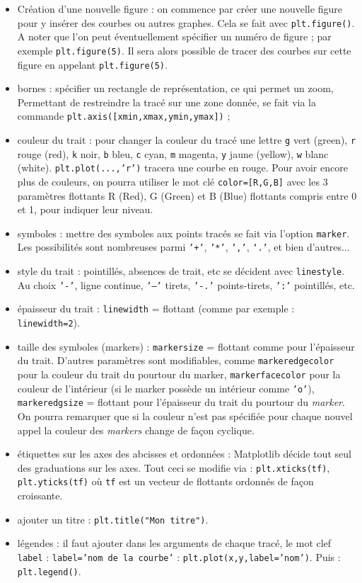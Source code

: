 \documentclass[a4paper,11pt,titlepage]{report}
\begin{document}
\begin{itemize}
\item Création d'une nouvelle figure : on commence par créer une nouvelle figure pour y insérer des courbes ou autres graphes. Cela se fait avec \texttt{plt.figure()}. A noter que l'on peut éventuellement spécifier un numéro de figure ; par exemple \texttt{plt.figure(5)}. Il sera alors possible de tracer des courbes sur cette figure en appelant \texttt{plt.figure(5)}.
\item bornes : spécifier un rectangle de représentation, ce qui permet un zoom, Permettant de restreindre la tracé sur une zone donnée, se fait via la commande \texttt{plt.axis([xmin,xmax,ymin,ymax])} ;
\item couleur du trait : pour changer la couleur du tracé une lettre \texttt{g} vert (green), \texttt{r} rouge (red), \texttt{k} noir, \texttt{b} bleu, \texttt{c} cyan, \texttt{m} magenta, \texttt{y} jaune (yellow), \texttt{w} blanc (white). \texttt{plt.plot(...,'r')} tracera une courbe en rouge. Pour avoir encore plus de couleurs, on pourra utiliser le mot clé \texttt{color=[R,G,B]} avec les 3 paramètres flottants R (Red), G (Green) et B (Blue) flottants compris entre 0 et 1, pour indiquer leur niveau.
\item symboles : mettre des symboles aux points tracés se fait via l’option \texttt{marker}. Les possibilités sont nombreuses parmi \texttt{'+'}, \texttt{'*'}, \texttt{','}, \texttt{‘.’}, et bien d'autres...
\item style du trait : pointillés, absences de trait, etc se décident avec \texttt{linestyle}. Au choix \texttt{'-'}, ligne continue, \texttt{'--'} tirets, \texttt{'-.'} points-tirets, \texttt{':'} pointillés, etc.
\item épaisseur du trait : \texttt{linewidth} = flottant (comme par exemple : \texttt{linewidth=2}).
\item taille des symboles (markers) : \texttt{markersize} = flottant comme pour l’épaisseur du trait. D’autres paramètres sont modifiables, comme \texttt{markeredgecolor} pour la couleur du trait du pourtour du marker, \texttt{markerfacecolor} pour la couleur de l’intérieur (si le marker possède un intérieur comme \texttt{'o'}), \texttt{markeredgsize} = flottant pour l’épaisseur du trait du pourtour du \textit{marker}. On pourra remarquer que si la couleur n’est pas spécifiée pour chaque nouvel appel la couleur des \textit{markers} change de façon cyclique.
\item étiquettes sur les axes des abcisses et ordonnées : Matplotlib décide tout seul des graduations sur les axes. Tout ceci se modifie via : \texttt{plt.xticks(tf)}, \texttt{plt.yticks(tf)} où \texttt{tf} est un vecteur de flottants ordonnés de façon croissante.
\item ajouter un titre : \texttt{plt.title("Mon titre")}.
\item légendes : il faut ajouter dans les arguments de chaque tracé, le mot clef \texttt{label} : \texttt{label='nom de la courbe'} : \texttt{plt.plot(x,y,label='nom')}. Puis : \texttt{plt.legend()}.
\end{itemize}
\end{document}
